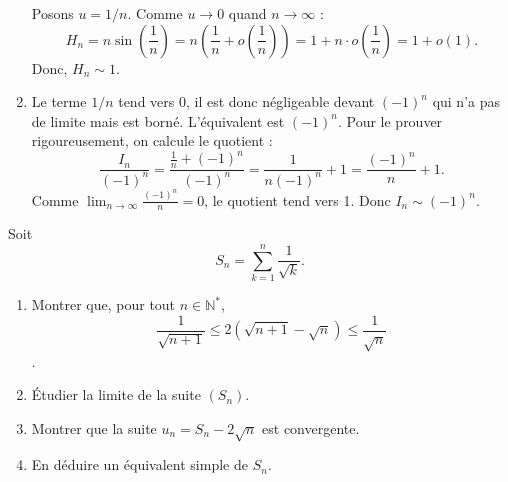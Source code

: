 \documentclass[solutions]{exercices}
\begin{document}
\begin{solution}
\begin{enumerate}[label=${\Alph*}_n)$]
		      Posons $u=1/n$. Comme $u \to 0$ quand $n \to \infty$ :
		      \[ H_n = n \sin\left(\frac{1}{n}\right) = n \left(\frac{1}{n} + o\left(\frac{1}{n}\right)\right) = 1 + n \cdot o\left(\frac{1}{n}\right) = 1 + o(1). \]
		      Donc, $ H_n \sim 1 $.
		\item Le terme $1/n$ tend vers 0, il est donc négligeable devant $(-1)^n$ qui n'a pas de limite mais est borné. L'équivalent est $(-1)^n$. Pour le prouver rigoureusement, on calcule le quotient :
		      \[ \frac{I_n}{(-1)^n} = \frac{\frac{1}{n} + (-1)^n}{(-1)^n} = \frac{1}{n(-1)^n} + 1 = \frac{(-1)^n}{n} + 1. \]
		      Comme $\lim_{n\to\infty} \frac{(-1)^n}{n} = 0$, le quotient tend vers 1. Donc $ I_n \sim (-1)^n $.
	\end{enumerate}
\end{solution}

\begin{exercice}[\di]
	Soit \[S_n = \sum_{k=1}^n \frac{1}{\sqrt{k}}.\]
	\begin{enumerate}
		\item Montrer que, pour tout $n \in \mathbb{N}^*$, \[\frac{1}{\sqrt{n+1}} \leq 2(\sqrt{n+1} - \sqrt{n}) \leq \frac{1}{\sqrt{n}}\].
		\item Étudier la limite de la suite $(S_n)$.
		\item Montrer que la suite $u_n = S_n - 2 \sqrt{n}$ est convergente.
		\item En déduire un équivalent simple de $S_n$.
	\end{enumerate}
\end{exercice}
\end{document}
